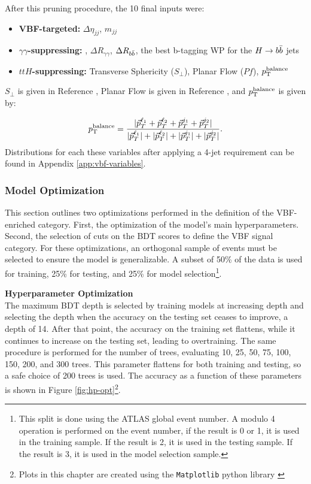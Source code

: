 After this pruning procedure, the 10 final inputs were: 
\begin{itemize}
\item \textbf{VBF-targeted:} $\Delta \eta_{jj}$, $m_{jj}$

\item \textbf{$\gamma \gamma$-suppressing:} \myybb, $\Delta R_{\gamma\gamma}$, $\Delta R_{b\bar{b}}$, the best b-tagging WP for the $H\rightarrow b\bar{b}$ jets

\item \textbf{$ttH$-suppressing:} Transverse Sphericity ($S_{\perp}$), Planar Flow ($Pf$), $p_{\text{T}}^\text{balance}$
\end{itemize}
%
$S_{\perp}$ is given in Reference \cite{STDM-2011-33}, Planar Flow is given in Reference \cite{planar-flow}, and $p_{\text{T}}^\text{balance}$ is given by:

\begin{equation} \label{eqn:pt-balance}
    p_{\text{T}}^\text{balance} = \frac
    {| \vec{p}_T^{\ell_1} + \vec{p}_T^{\ell_2} + \vec{p}_T^{j_1} +  \vec{p}_T^{j_2}|}
    {|\vec{p}_T^{\ell_1}| + |\vec{p}_T^{\ell_2}| + |\vec{p}_T^{j_1}| +  |\vec{p}_T^{j_2}|}.
\end{equation}
%
Distributions for each these variables after applying a 4-jet requirement can be found in Appendix \ref{app:vbf-variables}. 

\subsubsection{Model Optimization}

This section outlines two optimizations performed in the definition of the VBF-enriched category. First, the optimization of the model's main hyperparameters. Second, the selection of cuts on the \gls{BDT} scores to define the \gls{VBF} signal category. For these optimizations, an orthogonal sample of events must be selected to ensure the model is generalizable. A subset of 50\% of the data is used for training, 25\% for testing, and 25\% for model selection\footnote{This split is done using the ATLAS global event number. A modulo 4 operation is performed on the event number, if the result is 0 or 1, it is used in the training sample. If the result is 2, it is used in the testing sample. If the result is 3, it is used in the model selection sample.}.

\noindent\textbf{Hyperparameter Optimization}\\
\indent The maximum \gls{BDT} depth is selected by training models at increasing depth and selecting the depth when the accuracy on the testing set ceases to improve, a depth of 14. After that point, the accuracy on the training set flattens, while it continues to increase on the testing set, leading to overtraining. The same procedure is performed for the number of trees, evaluating 10, 25, 50, 75, 100, 150, 200, and 300 trees. This parameter flattens for both training and testing, so a safe choice of 200 trees is used. The accuracy as a function of these parameters is shown in Figure \ref{fig:hp-opt}\footnote{Plots in this chapter are created using the \texttt{Matplotlib} python library \cite{matplotlib}}.


